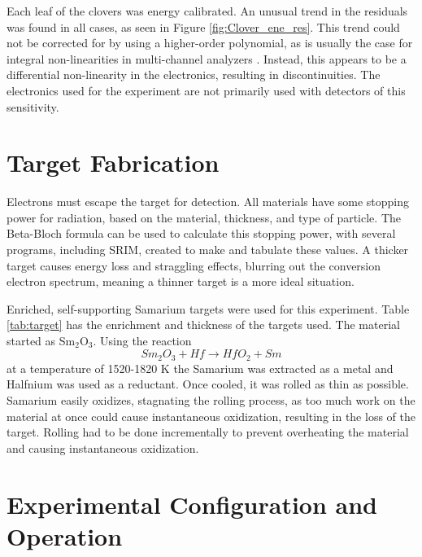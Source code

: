 

Each leaf of the clovers was energy calibrated. An unusual trend in the residuals was found in all cases, as seen in Figure \ref{fig:Clover_ene_res}. This trend could not be corrected for by using a higher-order polynomial, as is usually the case for integral non-linearities in multi-channel analyzers \citep{knoll00:rad_det_meas}. Instead, this appears to be a differential non-linearity in the electronics, resulting in discontinuities. The electronics used for the experiment are not primarily used with detectors of this sensitivity.



\section{Target Fabrication}

Electrons must escape the target for detection. All materials have some stopping power for radiation, based on the material, thickness, and type of particle. The Beta-Bloch formula can be used to calculate this stopping power, with several programs, including SRIM, created to make and tabulate these values\citep{ziegler10:_srim}. A thicker target causes energy loss and straggling effects, blurring out the conversion electron spectrum, meaning a thinner target is a more ideal situation.

Enriched, self-supporting Samarium targets were used for this experiment. Table \ref{tab:target} has the enrichment and thickness of the targets used. The material started as Sm$_2$O$_3$. Using the reaction
\begin{equation}
    Sm_2O_3 + Hf \xrightarrow{} HfO_2 + Sm
    \label{eq:sm_hf}
\end{equation}
at a temperature of 1520-1820 K the Samarium was extracted as a metal and Halfnium was used as a reductant\citep{clifford02:_target}. Once cooled, it was rolled as thin as possible. Samarium easily oxidizes, stagnating the rolling process, as too much work on the material at once could cause instantaneous oxidization, resulting in the loss of the target. Rolling had to be done incrementally to prevent overheating the material and causing instantaneous oxidization.



\section{Experimental Configuration and Operation}

